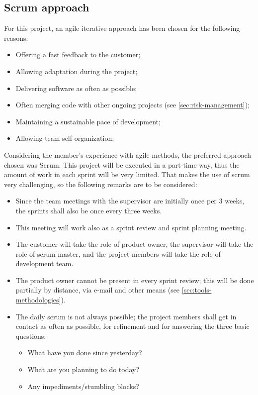 \subsection{Scrum approach}
%
%
%
%
%
For this project, an agile iterative approach has been chosen for the following reasons:
\begin{itemize}
	\item Offering a fast feedback to the customer;
	\item Allowing adaptation during the project;
	\item Delivering software as often as possible;
	\item Often merging code with other ongoing projects (see \autoref{sec:risk-management});
	\item Maintaining a sustainable pace of development;
	\item Allowing team self-organization;
\end{itemize}
%
Considering the member's experience with agile methods, the preferred approach chosen was Scrum.
This project will be executed in a part-time way, thus the amount of work in each sprint will be very limited.
That makes the use of scrum very challenging, so the following remarks are to be considered:
\begin{itemize}
	\item Since the team meetings with the supervisor are initially once per 3 weeks, the sprints shall also be once every three weeks.
	\item This meeting will work also as a sprint review and sprint planning meeting.
	\item The customer will take the role of product owner, the supervisor will take the role of scrum master, and the project members will take the role of development team.
	\item The product owner cannot be present in every sprint review; this will be done partially by distance, via e-mail and other means (see \autoref{sec:tools-methodologies}).
	\item The daily scrum is not always possible; the project members shall get in contact as often as possible, for refinement and for answering the three basic questions:
		\begin{itemize}
			\item What have you done since yesterday?
			\item What are you planning to do today?
			\item Any impediments/stumbling blocks?
		\end{itemize}
\end{itemize}

